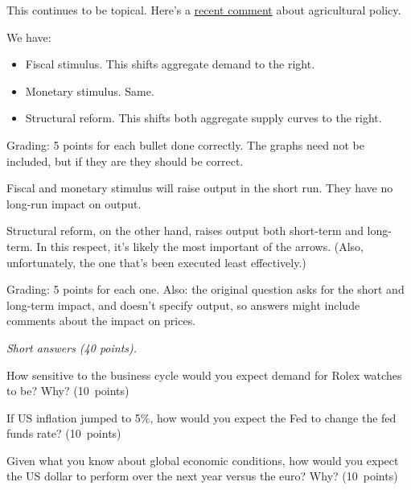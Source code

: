 \documentclass[letterpaper,12pt]{exam}
\begin{document}
\begin{questions}
\begin{solution}

This continues to be topical.
Here's a
\href{http://www.bloomberg.com/news/2013-12-12/abe-pushes-biggest-farm-revamp-since-macarthur-broke-landlords.html}
{recent comment} about agricultural policy.

\begin{parts}
\item We have:
\begin{itemize}
\item Fiscal stimulus. This shifts aggregate demand to the right.
\item Monetary stimulus. Same.
\item Structural reform. This shifts both aggregate supply curves to the right.
\end{itemize}
Grading:  5 points for each bullet done correctly.
The graphs need not be included, but if they are they should be correct.

\item Fiscal and monetary stimulus will raise output in the short run.
They have no long-run impact on output.

Structural reform, on the other hand, raises output both short-term and long-term.
In this respect, it's likely the most important of the arrows.
(Also, unfortunately, the one that's been executed least effectively.)

Grading: 5 points for each one.
Also:  the original question asks for the short and long-term impact, and doesn't
specify output, so answers might include comments about the impact on prices.
\end{parts}
\end{solution}


\item  {\it Short answers (40 points).\/}
\begin{parts}
\item  How sensitive to the business cycle would you expect demand for Rolex watches to be?
Why?
(10~points)

\item If US inflation jumped to 5\%, how would you expect
the Fed to change the fed funds rate?
(10~points)

\item  Given what you know about global economic conditions,
how would you expect the US dollar to perform over the next year versus the euro?  Why?
(10~points)


\end{parts}
\end{questions}
\end{document}
